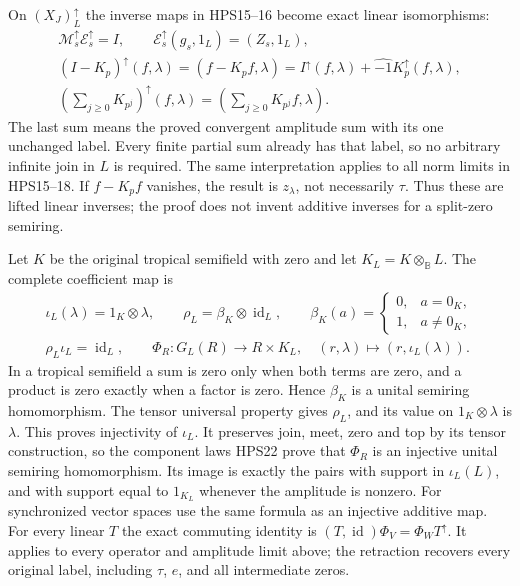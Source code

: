 On $(X_J)_L^\uparrow$ the inverse maps in
HPS15--16 become exact linear isomorphisms:
\begin{equation}\tag{HPS24}
\begin{gathered}
 \mathcal M_s^\uparrow\mathcal E_s^\uparrow=I,\qquad
 \mathcal E_s^\uparrow(g_s,1_L)=(Z_s,1_L),\\
 (I-K_p)^\uparrow(f,\lambda)
       =(f-K_pf,\lambda)
       =I^\uparrow(f,\lambda)
                         +\widehat{-1}K_p^\uparrow(f,\lambda),\\
 \left(\sum_{j\ge0}K_{p^j}\right)^\uparrow(f,\lambda)
             =\left(\sum_{j\ge0}K_{p^j}f,\lambda\right).
\end{gathered}
\end{equation}
The last sum means the proved convergent
amplitude sum with its one unchanged label.
Every finite partial sum already has that
label, so no arbitrary infinite join in $L$
is required. The same interpretation applies
to all norm limits in HPS15--18.
If $f-K_pf$ vanishes, the result is
$z_\lambda$, not necessarily $\tau$.
Thus these are lifted linear inverses;
the proof does not invent additive inverses
for a split-zero semiring.

Let $K$ be the original tropical semifield
with zero and let $K_L=K\otimes_{\mathbb B}L$.
The complete coefficient map is
\begin{equation}\tag{HPS25}
\begin{gathered}
 \iota_L(\lambda)=1_K\otimes\lambda,\qquad
 \rho_L=\beta_K\otimes\operatorname{id}_L,\qquad
 \beta_K(a)=\begin{cases}0,&a=0_K,\\1,&a\ne0_K,\end{cases}\\
 \rho_L\iota_L=\operatorname{id}_L,\qquad
 \Phi_R:G_L(R)\longrightarrow R\times K_L,\quad
            (r,\lambda)\longmapsto(r,\iota_L(\lambda)).
\end{gathered}
\end{equation}
In a tropical semifield a sum is zero only
when both terms are zero, and a product is
zero exactly when a factor is zero. Hence
$\beta_K$ is a unital semiring homomorphism.
The tensor universal property gives $\rho_L$,
and its value on $1_K\otimes\lambda$ is
$\lambda$. This proves injectivity of
$\iota_L$. It preserves join, meet, zero and
top by its tensor construction, so the
component laws HPS22 prove that $\Phi_R$ is
an injective unital semiring homomorphism.
Its image is exactly the pairs with support
in $\iota_L(L)$, and with support equal to
$1_{K_L}$ whenever the amplitude is nonzero.
For synchronized vector spaces use the same
formula as an injective additive map.
For every linear $T$ the exact commuting
identity is
$(T,\operatorname{id})\Phi_V=\Phi_WT^\uparrow$.
It applies to every operator and amplitude
limit above; the retraction recovers every
original label, including $\tau$, $e$, and
all intermediate zeros.

